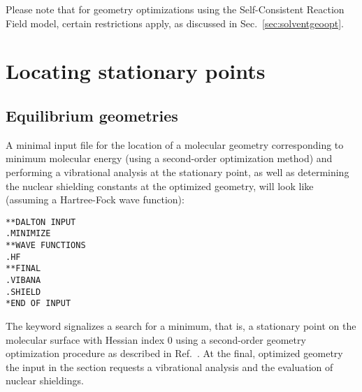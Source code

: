 Please note that for geometry optimizations using the Self-Consistent
Reaction Field model, certain restrictions apply, as discussed in
Sec.~\ref{sec:solventgeoopt}.

\section{Locating stationary points}

\subsection{Equilibrium geometries}
\label{sec:minimization}

\begin{center}
\end{center}

A minimal input file for the location of a molecular geometry
corresponding to minimum molecular energy
(using a second-order optimization
method) and performing a vibrational
analysis at the stationary point, as well
as determining the nuclear
shielding constants at the optimized
geometry, will look like
(assuming a Hartree-Fock wave function):

\begin{verbatim}
**DALTON INPUT
.MINIMIZE
**WAVE FUNCTIONS
.HF
**FINAL
.VIBANA
.SHIELD
*END OF INPUT
\end{verbatim}

The keyword  signalizes a search for a minimum, that is,
a stationary point on the molecular surface with Hessian index 0 using
a second-order geometry optimization procedure as described in
Ref.~\cite{tuhjahjajpjjcp84}. At
the final, optimized geometry the input in the  section requests
a vibrational analysis and the evaluation of nuclear shieldings.

